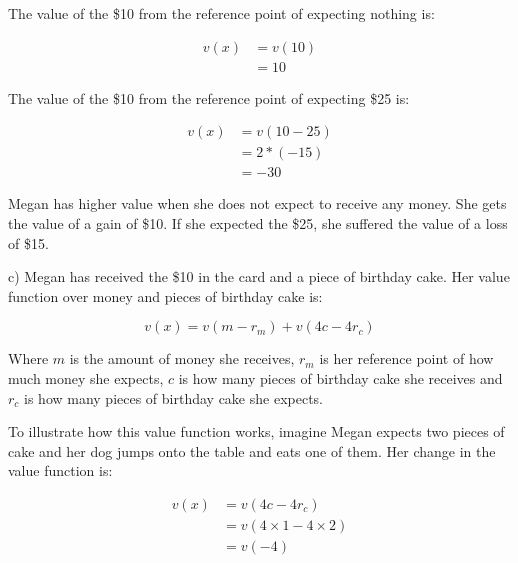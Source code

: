 \documentclass[
  letterpaper,
  DIV=11,
  numbers=noendperiod]{scrreprt}
\begin{document}
\begin{tcolorbox}[enhanced jigsaw, title=\textcolor{quarto-callout-tip-color}{\faLightbulb}\hspace{0.5em}{Answer}, toprule=.15mm, colback=white, breakable, titlerule=0mm, colframe=quarto-callout-tip-color-frame, coltitle=black, opacityback=0, rightrule=.15mm, colbacktitle=quarto-callout-tip-color!10!white, bottomtitle=1mm, opacitybacktitle=0.6, arc=.35mm, bottomrule=.15mm, toptitle=1mm, leftrule=.75mm, left=2mm]

The value of the \$10 from the reference point of expecting nothing is:

\begin{align*}
v(x)&=v(10) \\[6pt]
&=10
\end{align*}

\newpage

The value of the \$10 from the reference point of expecting \$25 is:

\begin{align*}
v(x)&=v(10-25) \\[6pt]
&=2*(-15) \\[6pt]
&=-30
\end{align*}

Megan has higher value when she does not expect to receive any money.
She gets the value of a gain of \$10. If she expected the \$25, she
suffered the value of a loss of \$15.

\end{tcolorbox}

c) Megan has received the \$10 in the card and a piece of birthday cake.
Her value function over money and pieces of birthday cake is:

\[
v(x)=v(m-r_m)+v(4c-4r_c)
\]

Where \(m\) is the amount of money she receives, \(r_m\) is her
reference point of how much money she expects, \(c\) is how many pieces
of birthday cake she receives and \(r_c\) is how many pieces of birthday
cake she expects.

To illustrate how this value function works, imagine Megan expects two
pieces of cake and her dog jumps onto the table and eats one of them.
Her change in the value function is:

\begin{align*}
v(x)&=v(4c-4r_c) \\
&=v(4\times 1-4\times 2) \\
&=v(-4)
\end{align*}
\end{document}
